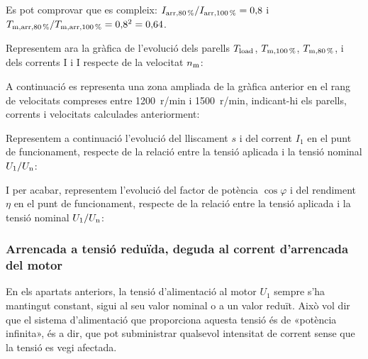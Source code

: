 \begin{exemple}
	Es pot comprovar que es compleix: $I_\mathrm{arr,\qty{80}{\%}} / I_\mathrm{arr,\qty{100}{\%}} = 0{,}8$ i $T_\mathrm{m,arr,\qty{80}{\%}} / T_\mathrm{m,arr,\qty{100}{\%}} = 0{,}8^2 = 0{,}64$.
		
 	Representem ara la gràfica de l'evolució dels parells $T_\mathrm{load}$,  $T_\mathrm{m,\qty{100}{\%}}$,  $T_\mathrm{m,\qty{80}{\%}}$, i dels	corrents I i I respecte de la velocitat $n_\mathrm{m}$:	
    \begin{center}
		\fontsize{10pt}{11pt}\selectfont
		
	\end{center}	

	\vspace{-2mm}
	A continuació es representa una zona ampliada de la gràfica anterior en el rang de velocitats compreses entre \qty{1200}{r/min} i  \qty{1500}{r/min}, indicant-hi els parells, corrents i velocitats calculades anteriorment:

	\begin{center}
		\fontsize{10pt}{11pt}\selectfont
		
	\end{center}

	Representem a continuació l'evolució del lliscament $s$ i del corrent $I_1$ en el punt de funcionament,  respecte de la relació entre la tensió aplicada i la tensió nominal $U_1/U_\mathrm{n}$:
	\begin{center}
		
	\end{center}
	
	I per acabar, representem l'evolució del factor de potència $\cos\varphi$ i del rendiment $\eta$ en el punt de funcionament, respecte de la relació entre la tensió aplicada i la tensió nominal $U_1/U_\mathrm{n}$:
	\begin{center}
		
	\end{center}
\end{exemple} 


\subsubsection{Arrencada a tensió reduïda, deguda al  corrent d'arrencada del motor}

En els apartats anteriors, la tensió d'alimentació al motor $U_1$ sempre s'ha mantingut constant, sigui al seu valor nominal o a un valor reduït. Això vol dir que el sistema d'alimentació que proporciona aquesta tensió és de «potència infinita», és a dir, que pot subministrar qualsevol intensitat de corrent sense que la tensió es vegi afectada.


